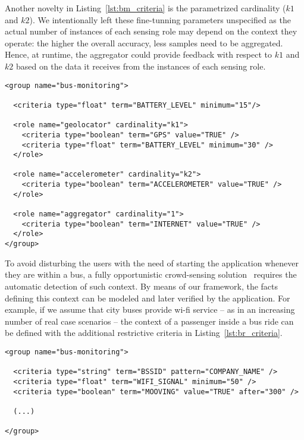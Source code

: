 Another novelty in Listing~\ref{lst:bm_criteria} is the parametrized cardinality ($k1$ and $k2$). We intentionally left these fine-tunning parameters unspecified as the actual number of instances of each sensing role may depend on the context they operate: the higher the overall accuracy, less samples need to be aggregated. Hence, at runtime, the aggregator could provide feedback with respect to $k1$ and $k2$ based on the data it receives from the instances of each sensing role. 



\begin{lstlisting}[caption=Specification of a bus monitoring group, label=lst:bm_criteria, captionpos=t]
<group name="bus-monitoring">
  
  <criteria type="float" term="BATTERY_LEVEL" minimum="15"/>
  
  <role name="geolocator" cardinality="k1">
    <criteria type="boolean" term="GPS" value="TRUE" />
    <criteria type="float" term="BATTERY_LEVEL" minimum="30" />
  </role>
  
  <role name="accelerometer" cardinality="k2">
    <criteria type="boolean" term="ACCELEROMETER" value="TRUE" />
  </role>
  
  <role name="aggregator" cardinality="1">
    <criteria type="boolean" term="INTERNET" value="TRUE" />
  </role>
</group>
\end{lstlisting}

To avoid disturbing the users with the need of starting the application whenever they are within a bus, a fully opportunistic crowd-sensing solution~\cite{Guo:2015} requires the automatic detection of such context. By means of our framework, the facts defining this context can be modeled and later verified by the application. For example, if we assume that city buses provide wi-fi service -- as in an increasing number of real case scenarios -- the context of a passenger inside a bus ride can be defined with the additional restrictive criteria in Listing~\ref{lst:br_criteria}.

\begin{lstlisting}[caption=Additional criteria to specify a bus ride context, label=lst:br_criteria, captionpos=t]
<group name="bus-monitoring">

  <criteria type="string" term="BSSID" pattern="COMPANY_NAME" />
  <criteria type="float" term="WIFI_SIGNAL" minimum="50" />
  <criteria type="boolean" term="MOOVING" value="TRUE" after="300" />
  
  (...)

</group>
\end{lstlisting}

